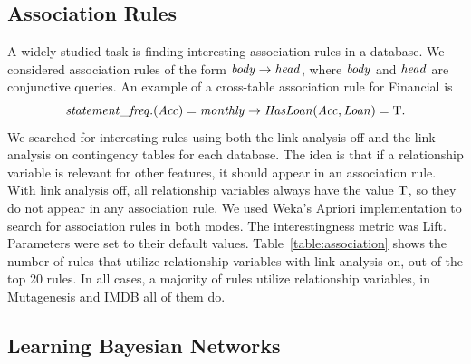 \documentclass{sig-alternate-2013}
\begin{document}
\subsection{Association Rules} A widely studied task is finding interesting association rules in a database. We considered association rules of the form $\it{body} \rightarrow \it{head}$, where $\it{body}$ and $\it{head}$ are conjunctive queries. An example of a cross-table association rule for Financial is 
%
$$\it{statement\_freq.(Acc)} = \it{monthly} \rightarrow \it{HasLoan}(\it{Acc},\it{Loan}) = \mathrm{T}.$$
%
We searched for interesting rules using both the link analysis off and the link analysis on contingency tables for each database. The idea is that if a relationship variable is relevant for other features, it should appear in an association rule. With link analysis off, all relationship variables always have the value $\mathrm{T}$, so they do not appear in any association rule. We used Weka's Apriori implementation to search for association rules in both modes. The interestingness metric was Lift. Parameters were set to their default values. Table~\ref{table:association} shows the number of rules that utilize relationship variables with link analysis on, out of the top 20 rules. In all cases, a majority of rules utilize relationship variables,  in Mutagenesis and IMDB all of them do. %
%
\begin{table}[htbp] \centering
{}
\caption{Number of top 20 Association Rules that utilize relationship variables.}
  \label{table:association}%
\end{table}%






\subsection{Learning Bayesian Networks}
\end{document}
